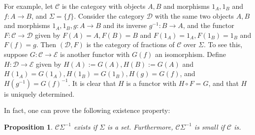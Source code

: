 \documentclass[12pt]{article}
\newtheorem{prop}{Proposition}
\begin{document}
For example, let $\mathcal{C}$ is the category with objects $A,B$ and morphisms $1_A,1_B$ and $f:A\to B$, and $\Sigma=\lbrace f\rbrace$.  Consider the category $\mathcal{D}$ with the same two objects $A,B$ and morphisms $1_A,1_B, g:A\to B$ and its inverse $g^{-1}:B\to A$, and the functor $F:\mathcal{C}\to \mathcal{D}$ given by $F(A)=A, F(B)=B$ and $F(1_A)=1_A,F(1_B)=1_B$ and $F(f)=g$.  Then $(\mathcal{D},F)$ is the category of fractions of $\mathcal{C}$ over $\Sigma$.  To see this, suppose $G:\mathcal{C}\to \mathcal{E}$ is another functor with $G(f)$ an isomorphism.  Define $H:\mathcal{D}\to \mathcal{E}$ given by $H(A):=G(A),H(B):=G(A)$ and $H(1_A)=G(1_A), H(1_B)=G(1_B), H(g)=G(f)$, and $H(g^{-1})= G(f)^{-1}$.  It is clear that $H$ is a functor with $H\circ F=G$, and that $H$ is uniquely determined.

In fact, one can prove the following existence property:
\begin{prop} $\mathcal{C}\Sigma^{-1}$ exists if $\Sigma$ is a set.  Furthermore, $\mathcal{C}\Sigma^{-1}$ is small if $\mathcal{C}$ is. \end{prop}
\end{document}
